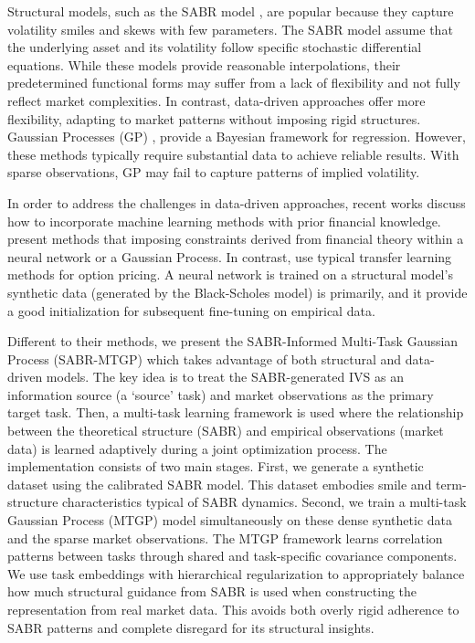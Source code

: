 \documentclass[preprint,12pt]{elsarticle}
\begin{document}
Structural models, such as the SABR model \citep{Hagan2002}, are popular because they capture volatility smiles and skews with few parameters. The SABR model assume that the underlying asset and its volatility follow specific stochastic differential equations. While these models provide reasonable interpolations, their predetermined functional forms may suffer from a lack of flexibility and not fully reflect market complexities. In contrast, data-driven approaches offer more flexibility, adapting to market patterns without imposing rigid structures. Gaussian Processes (GP) \citep{refWilliams2006}, provide a Bayesian framework for regression. However, these methods typically require substantial data to achieve reliable results. With sparse observations, GP may fail to capture patterns of implied volatility.

In order to address the challenges in data-driven approaches, recent works discuss how to incorporate machine learning methods with prior financial knowledge. \citet{cousin2022gaussian,chataigner2021beyond,Ackerer2020,zheng2021incorporating,gonon2024operator,hoshisashi2023no} present methods that imposing constraints derived from financial theory within a neural network or a Gaussian Process. In contrast, \citet{chen2023teaching} use typical transfer learning methods for option pricing. A neural network is trained on a structural model's synthetic data (generated by the Black-Scholes model) is primarily, and it provide a good initialization for subsequent fine-tuning on empirical data.

Different to their methods, we present the SABR-Informed Multi-Task Gaussian Process (SABR-MTGP) which takes advantage of both structural and data-driven models. The key idea is to treat the SABR-generated IVS as an information source (a `source' task) and market observations as the primary target task.  Then, a multi-task learning framework \citep{bonilla2007multi, alvarez2012kernels} is used where the relationship between the theoretical structure (SABR) and empirical observations (market data) is learned adaptively during a joint optimization process. The implementation consists of two main stages. First, we generate a synthetic dataset using the calibrated SABR model. This dataset embodies smile and term-structure characteristics typical of SABR dynamics. Second, we train a multi-task Gaussian Process (MTGP) model simultaneously on these dense synthetic data and the sparse market observations. The MTGP framework learns correlation patterns between tasks through shared and task-specific covariance components. We use task embeddings with hierarchical regularization to appropriately balance how much structural guidance from SABR is used when constructing the representation from real market data. This avoids both overly rigid adherence to SABR patterns and complete disregard for its structural insights.
\end{document}
